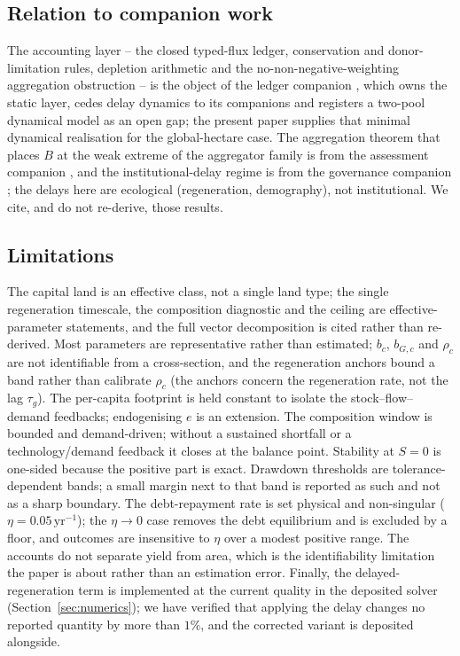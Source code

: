 \subsection{Relation to companion work}

The accounting layer -- the closed typed-flux ledger, conservation and donor-limitation rules, depletion arithmetic and the no-non-negative-weighting aggregation obstruction -- is the object of the ledger companion \citep{Abaee2026c}, which owns the static layer, cedes delay dynamics to its companions and registers a two-pool dynamical model as an open gap; the present paper supplies that minimal dynamical realisation for the global-hectare case. The aggregation theorem that places $B$ at the weak extreme of the aggregator family is from the assessment companion \citep{Abaee2026b}, and the institutional-delay regime is from the governance companion \citep{Abaee2026a}; the delays here are ecological (regeneration, demography), not institutional. We cite, and do not re-derive, those results.

\subsection{Limitations}

The capital land is an effective class, not a single land type; the single regeneration timescale, the composition diagnostic and the ceiling are effective-parameter statements, and the full vector decomposition is cited rather than re-derived. Most parameters are representative rather than estimated; $b_c$, $b_{G,c}$ and $\rho_c$ are not identifiable from a cross-section, and the regeneration anchors bound a band rather than calibrate $\rho_c$ (the anchors concern the regeneration rate, not the lag $\tau_g$). The per-capita footprint is held constant to isolate the stock--flow--demand feedbacks; endogenising $e$ is an extension. The composition window is bounded and demand-driven; without a sustained shortfall or a technology/demand feedback it closes at the balance point. Stability at $S=0$ is one-sided because the positive part is exact. Drawdown thresholds are tolerance-dependent bands; a small margin next to that band is reported as such and not as a sharp boundary. The debt-repayment rate is set physical and non-singular ($\eta=0.05\,\mathrm{yr}^{-1}$); the $\eta\to0$ case removes the debt equilibrium and is excluded by a floor, and outcomes are insensitive to $\eta$ over a modest positive range. The accounts do not separate yield from area, which is the identifiability limitation the paper is about rather than an estimation error. Finally, the delayed-regeneration term is implemented at the current quality in the deposited solver (Section~\ref{sec:numerics}); we have verified that applying the delay changes no reported quantity by more than $1\%$, and the corrected variant is deposited alongside.

